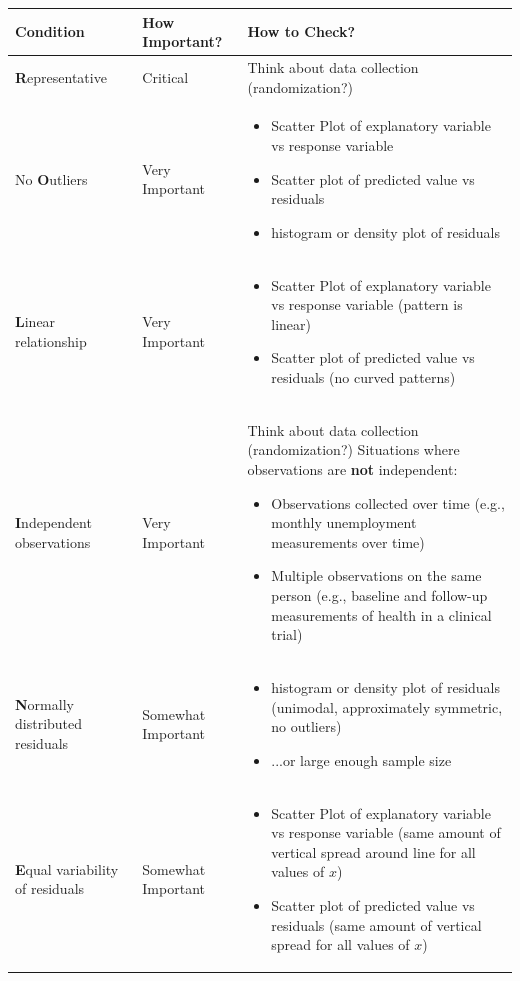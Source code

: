 \documentclass[14pt]{extarticle}
\begin{document}
\begin{table}[htbp]
\centering
\begin{tabular}{p{} p{} p{}}
\toprule
Condition & How Important? & How to Check? \\
\midrule
\textbf{R}epresentative & Critical & Think about data collection (randomization?) \\
\midrule
No \textbf{O}utliers & Very Important & \begin{itemize} \item Scatter Plot of explanatory variable vs response variable \item Scatter plot of predicted value vs residuals \item histogram or density plot of residuals \end{itemize} \\
\midrule
\textbf{L}inear relationship & Very Important & \begin{itemize} \item Scatter Plot of explanatory variable vs response variable (pattern is linear) \item Scatter plot of predicted value vs residuals (no curved patterns) \end{itemize} \\
\midrule
\textbf{I}ndependent observations & Very Important & Think about data collection (randomization?) Situations where observations are \textbf{not} independent: \begin{itemize} \item Observations collected over time (e.g., monthly unemployment measurements over time) \item Multiple observations on the same person (e.g., baseline and follow-up measurements of health in a clinical trial) \end{itemize} \\
\midrule
\textbf{N}ormally distributed residuals & Somewhat Important & \begin{itemize} \item histogram or density plot of residuals (unimodal, approximately symmetric, no outliers)
\item ...or large enough sample size \end{itemize} \\
\midrule
\textbf{E}qual variability of residuals & Somewhat Important & \begin{itemize} \item Scatter Plot of explanatory variable vs response variable (same amount of vertical spread around line for all values of $x$) \item Scatter plot of predicted value vs residuals (same amount of vertical spread for all values of $x$) \end{itemize} \\
\bottomrule
\end{tabular}
\label{table:mr}
\end{table}
\end{document}
